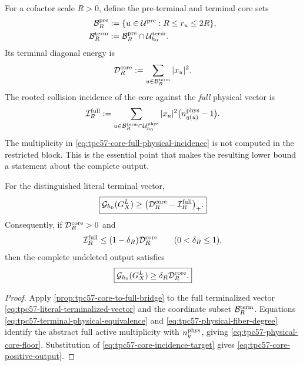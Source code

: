 For a cofactor scale \(R>0\), define the pre-terminal and terminal core
sets
\begin{align}
 \mathcal B_R^{\rm pre}
 &:=\{u\in\mathcal U^{\rm pre}:R\le r_u\le2R\},
 \label{eq:tpc57-preterminal-cofactor-core}\\
 \mathcal B_R^{\rm term}
 &:=\mathcal B_R^{\rm pre}\cap\mathcal U_{h_0}^{\rm term}.
 \label{eq:tpc57-terminal-cofactor-core}
\end{align}
Its terminal diagonal energy is
\begin{equation}
 \mathcal D_R^{\rm core}
 :=\sum_{u\in\mathcal B_R^{\rm term}}|x_u|^2.
 \label{eq:tpc57-core-terminal-energy}
\end{equation}
The rooted collision incidence of the core against the \emph{full}
physical vector is
\begin{equation}
 \mathcal I_R^{\rm full}
 :=\sum_{u\in\mathcal B_R^{\rm term}\cap\mathcal U_{h_0}^{\rm phys}}
 |x_u|^2\bigl(n_{q(u)}^{\rm phys}-1\bigr).
 \label{eq:tpc57-core-full-physical-incidence}
\end{equation}
The multiplicity in \eqref{eq:tpc57-core-full-physical-incidence} is not
computed in the restricted block.  This is the essential point that makes
the resulting lower bound a statement about the complete output.

\begin{theorem}
\label{thm:tpc57-physical-core-bridge}
For the distinguished literal terminal vector,
\begin{equation}
 \boxed{
 \mathcal G_{h_0}(G_X^L)
 \ge
 \bigl(\mathcal D_R^{\rm core}-\mathcal I_R^{\rm full}\bigr)_+.}
 \label{eq:tpc57-physical-core-floor}
\end{equation}
Consequently, if \(\mathcal D_R^{\rm core}>0\) and
\begin{equation}
 \mathcal I_R^{\rm full}
 \le(1-\delta_R)\mathcal D_R^{\rm core}
 \qquad(0<\delta_R\le1),
 \label{eq:tpc57-core-incidence-target}
\end{equation}
then the complete undeleted output satisfies
\begin{equation}
 \boxed{
 \mathcal G_{h_0}(G_X^L)
 \ge\delta_R\mathcal D_R^{\rm core}.}
 \label{eq:tpc57-core-positive-output}
\end{equation}
\end{theorem}

\begin{proof}
Apply \cref{prop:tpc57-core-to-full-bridge} to the full terminalized vector
\eqref{eq:tpc57-literal-terminalized-vector} and the coordinate subset
\(\mathcal B_R^{\rm term}\).  Equations
\eqref{eq:tpc57-terminal-physical-equivalence} and
\eqref{eq:tpc57-physical-fiber-degree} identify the abstract full active
multiplicity with \(n_y^{\rm phys}\), giving
\eqref{eq:tpc57-physical-core-floor}.  Substitution of
\eqref{eq:tpc57-core-incidence-target} gives
\eqref{eq:tpc57-core-positive-output}.
\end{proof}

